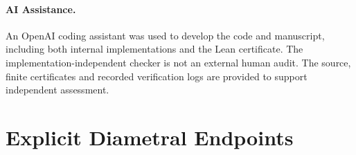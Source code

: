 \documentclass[11pt]{article}
\begin{document}
\paragraph{AI Assistance.}
An OpenAI coding assistant was used to develop the code and manuscript,
including both internal implementations and the Lean certificate. The
implementation-independent checker is not an external human audit. The
source, finite certificates and recorded verification logs are provided to
support independent assessment.

\clearpage
\appendix
\section{Explicit Diametral Endpoints}


\clearpage


\end{document}
